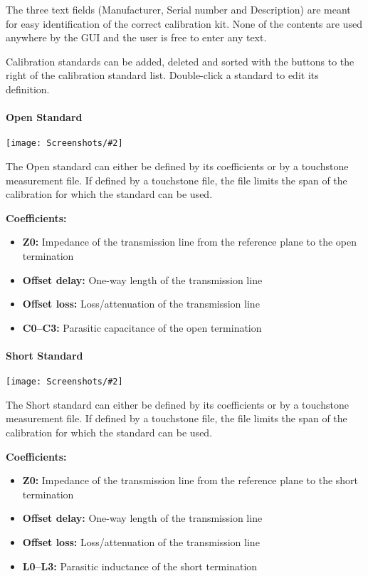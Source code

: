 \documentclass[a4paper,11pt]{article}
\newcommand{\screenshot}[2]{\begin{center}
\texttt{[image: Screenshots/\#2]}
\end{center}}
\begin{document}
The three text fields (Manufacturer, Serial number and Description) are meant for easy identification of the correct calibration kit. None of the contents are used anywhere by the GUI and the user is free to enter any text.

Calibration standards can be added, deleted and sorted with the buttons to the right of the calibration standard list. Double-click a standard to edit its definition.

\paragraph{Open Standard}
\screenshot{0.5}{OpenStandardDialog.png}
The Open standard can either be defined by its coefficients or by a touchstone measurement file. If defined by a touchstone file, the file limits the span of the calibration for which the standard can be used.

\textbf{Coefficients:}
\begin{itemize}
\item \textbf{Z0:} Impedance of the transmission line from the reference plane to the open termination
\item \textbf{Offset delay:} One-way length of the transmission line
\item \textbf{Offset loss:} Loss/attenuation of the transmission line
\item \textbf{C0--C3:} Parasitic capacitance of the open termination
\end{itemize}

\paragraph{Short Standard}
\screenshot{0.5}{ShortStandardDialog.png}
The Short standard can either be defined by its coefficients or by a touchstone measurement file. If defined by a touchstone file, the file limits the span of the calibration for which the standard can be used.

\textbf{Coefficients:}
\begin{itemize}
\item \textbf{Z0:} Impedance of the transmission line from the reference plane to the short termination
\item \textbf{Offset delay:} One-way length of the transmission line
\item \textbf{Offset loss:} Loss/attenuation of the transmission line
\item \textbf{L0--L3:} Parasitic inductance of the short termination
\end{itemize}
\end{document}
